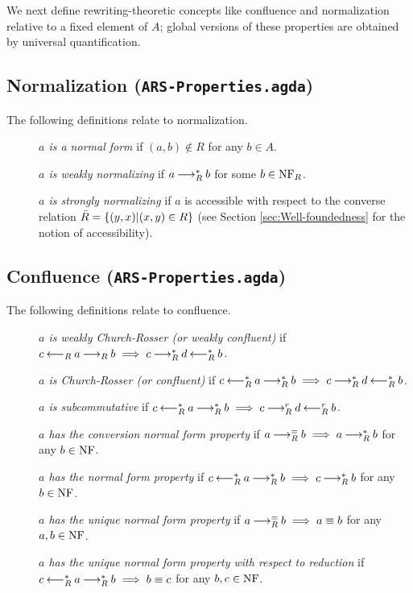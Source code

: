 We next define rewriting-theoretic concepts like confluence and normalization relative to a fixed element of $A$; global versions of these properties are obtained by universal quantification.
\subsection{Normalization (\texttt{ARS-Properties.agda})}
\begin{definition} The following definitions relate to normalization. 
  \begin{description}
    \item[] \emph{$a$ is a normal form} if $(a,b) \notin R$ for any $b \in A$.
    \item[] \emph{$a$ is weakly normalizing} if $a \mathbin{\longrightarrow_R^*} b$ for some $b \in \mathrm{NF}_R$.
    \item[] \emph{$a$ is strongly normalizing} if $a$ is accessible with respect to the converse relation $\bar{R} = \left\{(y,x) | (x,y) \in R\right\}$ 
    (see Section \ref{sec:Well-foundedness} for the notion of accessibility).
  \end{description}
\end{definition}



\subsection{Confluence (\texttt{ARS-Properties.agda})}
\begin{definition} The following definitions relate to confluence.
    \begin{description}
        \item[] \emph{$a$ is weakly Church-Rosser (or weakly confluent)} if $c \mathbin{\longleftarrow_R} a \mathbin{\longrightarrow_R} b \implies c \mathbin{\longrightarrow_R^*} d \mathbin{\longleftarrow_R^*} b$.
        \item[] \emph{$a$ is Church-Rosser (or confluent)} if $c \mathbin{\longleftarrow_R^*} a \mathbin{\longrightarrow_R^*} b \implies c \mathbin{\longrightarrow_R^*} d \mathbin{\longleftarrow_R^*} b$.
        \item[] \emph{$a$ is subcommutative} if $c \mathbin{\longleftarrow_R^*} a \mathbin{\longrightarrow_R^*} b \implies c \mathbin{\longrightarrow_R^r} d \mathbin{\longleftarrow_R^r} b$.
        \item[] \emph{$a$ has the conversion normal form property} if $a \mathbin{\longrightarrow_R^=} b \implies a\mathbin{\longrightarrow_R^*} b$ for any $b \in \mathrm{NF}$.
        \item[] \emph{$a$ has the normal form property} if $c \mathbin{\longleftarrow_R^*} a \mathbin{\longrightarrow_R^*} b \implies c \mathbin{\longrightarrow_R^*} b$ for any $b \in \mathrm{NF}$.
        \item[] \emph{$a$ has the unique normal form property} if $a \mathbin{\longrightarrow_R^=} b \implies a \equiv b$  for any $a, b \in \mathrm{NF}$.
        \item[] \emph{$a$ has the unique normal form property with respect to reduction} if $c \mathbin{\longleftarrow_R^*} a \mathbin{\longrightarrow_R^*} b  \implies b \equiv c$  for any $b, c \in \mathrm{NF}$.
    \end{description}
\end{definition}

